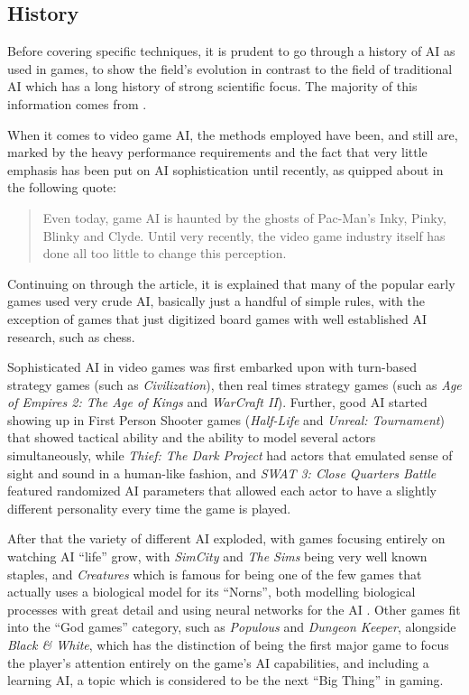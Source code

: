 \documentclass[]{report}
\begin{document}
\subsection{History}
\label{sec:game-ai-history}

Before covering specific techniques, it is prudent to go through a history of AI
as used in games, to show the field's evolution in contrast to the field of
traditional AI which has a long history of strong scientific focus. The majority
of this information comes from \citet{tozour2002evolution}.

When it comes to video game AI, the methods employed have been, and still are,
marked by the heavy performance requirements and the fact that very little
emphasis has been put on AI sophistication until recently, as quipped about in
the following quote:

\begin{quote}
  Even today, game AI is haunted by the ghosts of Pac-Man's Inky, Pinky, Blinky
  and Clyde. Until very recently, the video game industry itself has done all
  too little to change this perception.
\end{quote}

Continuing on through the article, it is explained that many of the popular
early games used very crude AI, basically just a handful of simple rules, with
the exception of games that just digitized board games with well established AI
research, such as chess.

Sophisticated AI in video games was first embarked upon with turn-based strategy
games (such as \emph{Civilization}), then real times strategy games (such as
\emph{Age of Empires 2: The Age of Kings} and \emph{WarCraft II}). Further, good
AI started showing up in First Person Shooter games (\emph{Half-Life} and
\emph{Unreal: Tournament}) that showed tactical ability and the ability to model
several actors simultaneously, while \emph{Thief: The Dark Project} had actors
that emulated sense of sight and sound in a human-like fashion, and \emph{SWAT
  3: Close Quarters Battle} featured randomized AI parameters that allowed each
actor to have a slightly different personality every time the game is played.

After that the variety of different AI exploded, with games focusing entirely on
watching AI ``life'' grow, with \emph{SimCity} and \emph{The Sims} being very
well known staples, and \emph{Creatures} which is famous for being one of the
few games that actually uses a biological model for its ``Norns'', both
modelling biological processes with great detail and using neural networks for
the AI \citep[see][]{grand1997creatures}. Other games fit into the ``God games''
category, such as \emph{Populous} and \emph{Dungeon Keeper}, alongside
\emph{Black \& White}, which has the distinction of being the first major game
to focus the player's attention entirely on the game's AI capabilities, and
including a learning AI, a topic which is considered to be the next ``Big
Thing'' in gaming.
\end{document}
